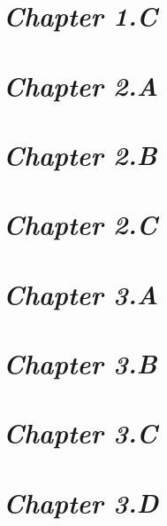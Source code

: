 \documentclass[a4paper,12pt]{article}
\begin{document}
    \section{\large \textit{Chapter 1.C}}

    

    \newpage

    \section{\large \textit{Chapter 2.A}}

    

    \newpage

    \section{\large \textit{Chapter 2.B}}

    

    \newpage

    \section{\large \textit{Chapter 2.C}}

    

    \newpage

    \section{\large \textit{Chapter 3.A}}

    

    \newpage

    \section{\large \textit{Chapter 3.B}}

    

    \newpage

    \section{\large \textit{Chapter 3.C}}

    

    \newpage

    \section{\large \textit{Chapter 3.D}}
\end{document}

